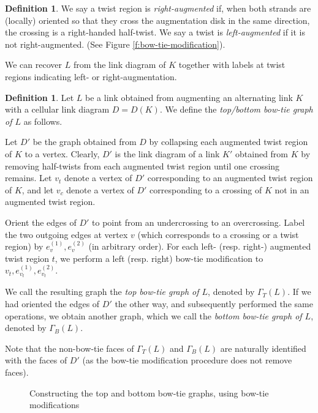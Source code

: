 \documentclass[11pt]{amsart}
\newcommand{\figref}[1]{Figure \ref{#1}}
\theoremstyle{plain}
\theoremstyle{definition}
\newtheorem{define}[theorem]{Definition}
\newtheorem{definition}[theorem]{Definition}
\begin{document}
\begin{define}
We say a twist region is \emph{right-augmented} if, when both strands are
(locally) oriented so that they cross the augmentation disk in the same
direction, the crossing is a right-handed half-twist.
We say a twist is \emph{left-augmented} if it is not right-augmented.
(See \figref{f:bow-tie-modification}).
\end{define}


We can recover $L$ from the link diagram of $K$
together with labels at twist regions indicating left- or right-augmentation.

\begin{definition}
\label{d:tori-decomp-graph}
Let $L$ be a link obtained from augmenting an alternating link $K$
with a cellular link diagram $D = D(K)$.
We define the \emph{top/bottom bow-tie graph of $L$} as follows.


Let $D'$ be the graph obtained from $D$
by collapsing each augmented twist region of $K$ to a vertex.
Clearly, $D'$ is the link diagram of a link $K'$
obtained from $K$ by removing half-twists from each augmented twist region
until one crossing remains.
Let $v_t$ denote a vertex of $D'$ corresponding to
an augmented twist region of $K$,
and let $v_c$ denote a vertex of $D'$ corresponding to
a crossing of $K$ not in an augmented twist region.


Orient the edges of $D'$ to point from an undercrossing
to an overcrossing.
Label the two outgoing edges at vertex $v$
(which corresponds to a crossing or a twist region)
by $e_v^{(1)}, e_v^{(2)}$ (in arbitrary order).
For each left- (resp. right-) augmented twist region $t$,
we perform a left (resp. right) bow-tie modification to
$v_t, e_{v_t}^{(1)}, e_{v_t}^{(2)}$.


We call the resulting graph the \emph{top bow-tie graph of $L$},
denoted by $\Gamma_T(L)$.
If we had oriented the edges of $D'$ the other way,
and subsequently performed the same operations,
we obtain another graph,
which we call the \emph{bottom bow-tie graph of $L$},
denoted by $\Gamma_B(L)$.


Note that the non-bow-tie faces of $\Gamma_T(L)$ and $\Gamma_B(L)$
are naturally identified with the faces of $D'$
(as the bow-tie modification procedure does not remove faces).
\end{definition}

\begin{figure}[ht]

\caption{Constructing the top and bottom bow-tie graphs,
using bow-tie modifications}
\label{f:tori-decomp-graph}
\end{figure}
\end{document}
